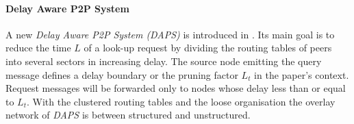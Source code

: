 %
%

%
%

\paragraph*{ \bf Delay Aware P2P System}
A new \emph{Delay Aware P2P System (DAPS)} is introduced in
\cite{zhang_daps_2005}. Its main goal is to reduce the time $L$ of a look-up
request by dividing the routing tables of peers into several sectors in
increasing delay. The source node emitting the query message defines a delay
boundary or the pruning factor $L_t$ in the paper's context. Request messages
will be forwarded only to nodes whose delay less than or equal to $L_t$. With
the clustered routing tables and the loose organisation the overlay network of
\emph{DAPS} is between structured and unstructured.







